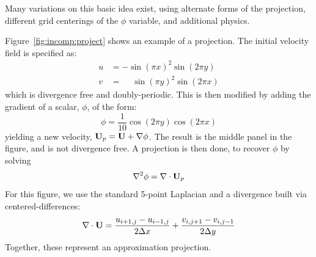 Many variations on this basic idea exist, using alternate forms of the
projection, different grid centerings of the $\phi$ variable, and
additional physics.

Figure~\ref{fig:incomp:project} shows an example of a projection.  The
initial velocity field is specified as:
\begin{align}
\label{eq:incomp:proju}
  u &= -\sin(\pi x)^2 \sin(2\pi y) \\
\label{eq:incomp:projv}
  v &= \phantom{+} \sin(\pi y)^2 \sin(2\pi x)
\end{align}
which is divergence free and doubly-periodic.  This is then modified
by adding the gradient of a scalar, $\phi$, of the form:
\begin{equation}
\label{eq:incomp:projphi}
\phi = \frac{1}{10} \cos(2\pi y) \cos(2\pi x) 
\end{equation}
yielding a new velocity, ${\bf U}_p = {\bf U} + \nabla \phi$.
The result is the middle panel in the figure, and is not divergence free.
A projection is then done, to recover $\phi$ by solving
\begin{equation}
\nabla^2 \phi = \nabla \cdot {\bf U}_p
\end{equation}
For this figure, we use the standard 5-point Laplacian and a divergence
built via centered-differences:
\begin{equation}
\nabla \cdot {\bf U} = \frac{u_{i+1,j} - u_{i-1,j}}{2\Delta x} + \frac{v_{i,j+1} - v_{i,j-1}}{2\Delta y}
\end{equation}
Together, these represent an approximation projection. 

